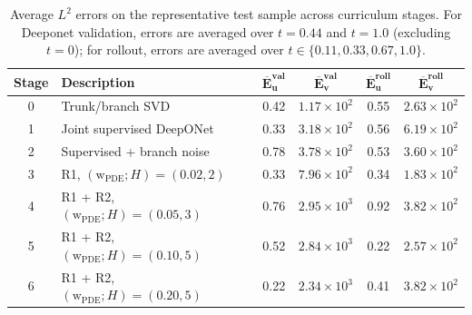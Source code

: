 \begin{table}[htbp]
  \centering
  \small
  \caption{Average \(L^2\) errors on the representative test sample across curriculum stages.
  For Deeponet validation, errors are averaged over \(t = 0.44\) and \(t = 1.0\) (excluding \(t = 0\));
  for rollout, errors are averaged over \(t \in \{0.11, 0.33, 0.67, 1.0\}\).}
  \label{tab:curriculum_errors}
  \begin{tabular}{clcccc}
    \toprule
    \textbf{Stage} &
    \textbf{Description} &
    \(\boldsymbol{\overline{E}_{u}^{\text{val}}}\) &
    \(\boldsymbol{\overline{E}_{v}^{\text{val}}}\) &
    \(\boldsymbol{\overline{E}_{u}^{\text{roll}}}\) &
    \(\boldsymbol{\overline{E}_{v}^{\text{roll}}}\) \\
    \midrule
    0 & Trunk/branch SVD
      & 0.42 & \(1.17 \times 10^{2}\) & 0.55 & \(2.63 \times 10^{2}\) \\
    1 & Joint supervised DeepONet
      & 0.33 & \(3.18 \times 10^{2}\) & 0.56 & \(6.19 \times 10^{2}\) \\
    2 & Supervised + branch noise
      & 0.78 & \(3.78 \times 10^{2}\) & 0.53 & \(3.60 \times 10^{2}\) \\
    3 & R1, \((\textrm{w}_{\textrm{PDE}}; H) = (0.02, 2)\)
      & 0.33 & \(7.96 \times 10^{2}\) & 0.34 & \(1.83 \times 10^{2}\) \\
    4 & R1 + R2, \((\textrm{w}_{\textrm{PDE}}; H) =(0.05, 3)\)
      & 0.76 & \(2.95 \times 10^{3}\) & 0.92 & \(3.82 \times 10^{2}\) \\
    5 & R1 + R2, \((\textrm{w}_{\textrm{PDE}}; H) =(0.10, 5)\)
      & 0.52 & \(2.84 \times 10^{3}\) & 0.22 & \(2.57 \times 10^{2}\) \\
    6 & R1 + R2, \((\textrm{w}_{\textrm{PDE}}; H) =(0.20, 5)\)
      & 0.22 & \(2.34 \times 10^{3}\) & 0.41 & \(3.82 \times 10^{2}\) \\
    \bottomrule
  \end{tabular}
\end{table}